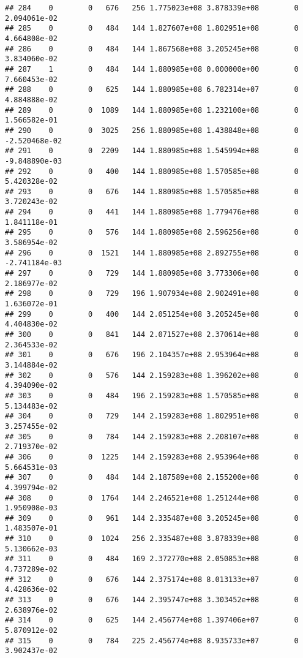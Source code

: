 \documentclass[
]{article}
\begin{document}
\begin{enumerate}
\begin{verbatim}
## 284    0        0   676   256 1.775023e+08 3.878339e+08        0  2.094061e-02
## 285    0        0   484   144 1.827607e+08 1.802951e+08        0  4.664808e-02
## 286    0        0   484   144 1.867568e+08 3.205245e+08        0  3.834060e-02
## 287    1        0   484   144 1.880985e+08 0.000000e+00        0  7.660453e-02
## 288    0        0   625   144 1.880985e+08 6.782314e+07        0  4.884888e-02
## 289    0        0  1089   144 1.880985e+08 1.232100e+08        0  1.566582e-01
## 290    0        0  3025   256 1.880985e+08 1.438848e+08        0 -2.520468e-02
## 291    0        0  2209   144 1.880985e+08 1.545994e+08        0 -9.848890e-03
## 292    0        0   400   144 1.880985e+08 1.570585e+08        0  5.420328e-02
## 293    0        0   676   144 1.880985e+08 1.570585e+08        0  3.720243e-02
## 294    0        0   441   144 1.880985e+08 1.779476e+08        0  1.841118e-01
## 295    0        0   576   144 1.880985e+08 2.596256e+08        0  3.586954e-02
## 296    0        0  1521   144 1.880985e+08 2.892755e+08        0 -2.741184e-03
## 297    0        0   729   144 1.880985e+08 3.773306e+08        0  2.186977e-02
## 298    0        0   729   196 1.907934e+08 2.902491e+08        0  1.636072e-01
## 299    0        0   400   144 2.051254e+08 3.205245e+08        0  4.404830e-02
## 300    0        0   841   144 2.071527e+08 2.370614e+08        0  2.364533e-02
## 301    0        0   676   196 2.104357e+08 2.953964e+08        0  3.144884e-02
## 302    0        0   576   144 2.159283e+08 1.396202e+08        0  4.394090e-02
## 303    0        0   484   196 2.159283e+08 1.570585e+08        0  5.134483e-02
## 304    0        0   729   144 2.159283e+08 1.802951e+08        0  3.257455e-02
## 305    0        0   784   144 2.159283e+08 2.208107e+08        0  2.719370e-02
## 306    0        0  1225   144 2.159283e+08 2.953964e+08        0  5.664531e-03
## 307    0        0   484   144 2.187589e+08 2.155200e+08        0  4.399794e-02
## 308    0        0  1764   144 2.246521e+08 1.251244e+08        0  1.950908e-03
## 309    0        0   961   144 2.335487e+08 3.205245e+08        0  1.483507e-01
## 310    0        0  1024   256 2.335487e+08 3.878339e+08        0  5.130662e-03
## 311    0        0   484   169 2.372770e+08 2.050853e+08        0  4.737289e-02
## 312    0        0   676   144 2.375174e+08 8.013133e+07        0  4.428636e-02
## 313    0        0   676   144 2.395747e+08 3.303452e+08        0  2.638976e-02
## 314    0        0   625   144 2.456774e+08 1.397406e+07        0  5.870912e-02
## 315    0        0   784   225 2.456774e+08 8.935733e+07        0  3.902437e-02

\end{verbatim}
\end{enumerate}
\end{document}
